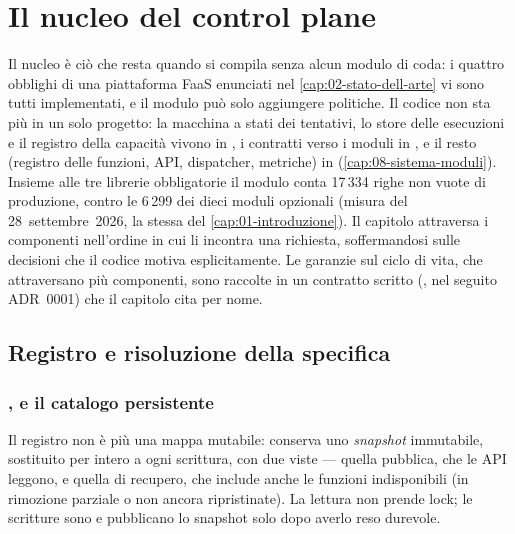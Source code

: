 \chapter{Il nucleo del control plane}
\label{cap:06-nucleo}

Il nucleo \`e ci\`o che resta quando si compila \nf{} senza alcun modulo di coda:
i quattro obblighi di una piattaforma FaaS enunciati nel
\cref{cap:02-stato-dell-arte} vi sono tutti implementati, e il modulo pu\`o solo
aggiungere politiche. Il codice non sta pi\`u in un solo progetto: la macchina a
stati dei tentativi, lo store delle esecuzioni e il registro della capacit\`a
vivono in , i contratti verso i moduli in
, e il resto (registro delle funzioni, API,
dispatcher, metriche) in 
(\cref{cap:08-sistema-moduli}). Insieme alle tre librerie obbligatorie il modulo
 conta 17\,334 righe non vuote di produzione, contro le 6\,299 dei
dieci moduli opzionali (misura del 28~settembre~2026, la stessa del
\cref{cap:01-introduzione}). Il capitolo attraversa i componenti
nell'ordine in cui li incontra una richiesta, soffermandosi sulle decisioni che il
codice motiva esplicitamente. Le garanzie sul ciclo di vita, che attraversano pi\`u
componenti, sono raccolte in un contratto scritto
(, nel seguito ADR~0001)
che il capitolo cita per nome.

\section{Registro e risoluzione della specifica}

\subsection{,  e il catalogo persistente}

Il registro non \`e pi\`u una mappa mutabile:  conserva uno
\emph{snapshot} immutabile, sostituito per intero a ogni scrittura, con due viste
--- quella pubblica, che le API leggono, e quella di recupero, che include anche
le funzioni indisponibili (in rimozione parziale o non ancora ripristinate).
La lettura non prende lock; le scritture sono  e pubblicano
lo snapshot solo dopo averlo reso durevole.

